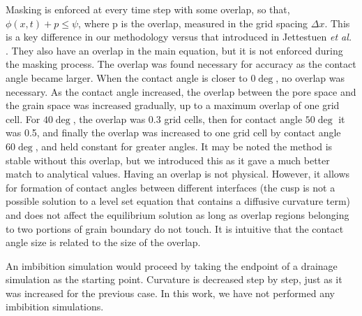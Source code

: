 Masking is enforced at every time step with some overlap, so that, $\phi(x,t)+p\leq\psi$, where p is the overlap, measured in the grid spacing $\Delta x$. This is a key difference in our methodology versus that introduced in Jettestuen \emph{et al.} \cite{jettestuen_level_2013}. They also have an overlap in the main equation, but it is not enforced during the masking process. The overlap was found necessary for accuracy as the contact angle became larger. When the contact angle is closer to $0\deg$, no overlap was necessary. As the contact angle increased, the overlap between the pore space and the grain space was increased gradually, up to a maximum overlap of one grid cell. For $40\deg$, the overlap was 0.3 grid cells, then for contact angle $50\deg$ it was 0.5, and finally the overlap was increased to one grid cell by contact angle $60\deg$, and held constant for greater angles. It may be noted the method is stable without this overlap, but we introduced this as it gave a much better match to analytical values. Having an overlap is not physical. However, it allows for formation of contact angles between different interfaces (the cusp is not a possible solution to a level set equation that contains a diffusive curvature term) and does not affect the equilibrium solution as long as overlap regions belonging to two portions of grain boundary do not touch. It is intuitive that the contact angle size is related to the size of the overlap.

An imbibition simulation would proceed by taking the endpoint of a drainage simulation as the starting point. Curvature is decreased step by step, just as it was increased for the previous case. In this work, we have not performed any imbibition simulations.

